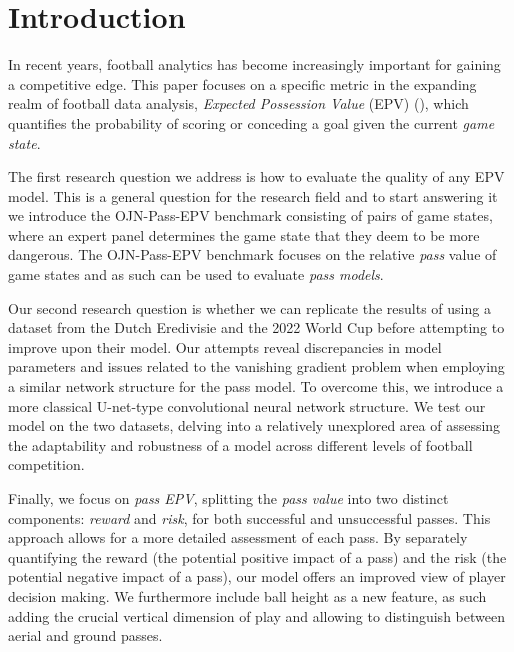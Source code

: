 \section{Introduction}

In recent years, football analytics has become increasingly important for gaining a competitive edge. This paper focuses on a specific metric in the expanding realm of football data analysis, \textit{Expected Possession Value} (EPV) (\cite{fernandez2019decomposing}), which quantifies the probability of scoring or conceding a goal given the current \textit{game state}.

The first research question we address is how to evaluate the quality of any EPV model. This is a general question for the research field and to start answering it we introduce the OJN-Pass-EPV benchmark consisting of pairs of game states, where an expert panel determines the game state that they deem to be more dangerous. The OJN-Pass-EPV benchmark focuses on the relative \textit{pass} value of game states and as such can be used to evaluate \textit{pass models}.

Our second research question is whether we can replicate the results of \cite{Fernández2021} using a dataset from the Dutch Eredivisie and the 2022 World Cup before attempting to improve upon their model. Our attempts reveal discrepancies in model parameters and issues related to the vanishing gradient problem when employing a similar network structure for the pass model. To overcome this, we introduce a more classical U-net-type convolutional neural network structure. We test our model on the two datasets, delving into a relatively unexplored area of assessing the adaptability and robustness of a model across different levels of football competition.

Finally, we focus on \textit{pass EPV}, splitting the \textit{pass value} into two distinct components: \textit{reward} and \textit{risk}, for both successful and unsuccessful passes. This approach allows for a more detailed assessment of each pass.
By separately quantifying the reward (the potential positive impact of a pass) and the risk (the potential negative impact of a pass), our model offers an improved view of player decision making. We furthermore include ball height as a new feature, as such adding the crucial vertical dimension of play and allowing to distinguish between aerial and ground passes.

